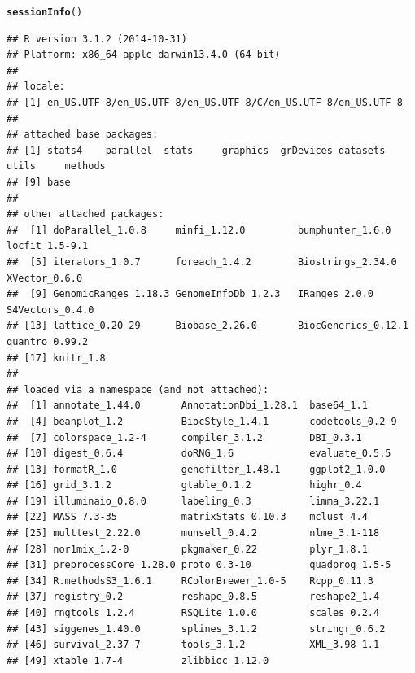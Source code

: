 \documentclass{article}\usepackage[]{graphicx}\usepackage[usenames,dvipsnames]{color}
\makeatletter
\newcommand{\hlstd}[1]{\textcolor[rgb]{0.345,0.345,0.345}{#1}}%
\newcommand{\hlkwd}[1]{\textcolor[rgb]{0.737,0.353,0.396}{\textbf{#1}}}%
\newenvironment{kframe}{%
 \def\at@end@of@kframe{}%
 \ifinner\ifhmode%
  \def\at@end@of@kframe{\end{minipage}}%
  \begin{minipage}{\columnwidth}%
 \fi\fi%
 \def\FrameCommand##1{\hskip\@totalleftmargin \hskip-\fboxsep
 \colorbox{shadecolor}{##1}\hskip-\fboxsep
     \hskip-\linewidth \hskip-\@totalleftmargin \hskip\columnwidth}%
 \MakeFramed {\advance\hsize-\width
   \@totalleftmargin\z@ \linewidth\hsize
   \@setminipage}}%
 {\par\unskip\endMakeFramed%
 \at@end@of@kframe}
\newenvironment{knitrout}{}{} %
\makeatother
\begin{document}
\begin{knitrout}
\color{fgcolor}\begin{kframe}
\begin{alltt}
\hlkwd{sessionInfo}\hlstd{()}
\end{alltt}
\begin{verbatim}
## R version 3.1.2 (2014-10-31)
## Platform: x86_64-apple-darwin13.4.0 (64-bit)
## 
## locale:
## [1] en_US.UTF-8/en_US.UTF-8/en_US.UTF-8/C/en_US.UTF-8/en_US.UTF-8
## 
## attached base packages:
## [1] stats4    parallel  stats     graphics  grDevices datasets  utils     methods  
## [9] base     
## 
## other attached packages:
##  [1] doParallel_1.0.8     minfi_1.12.0         bumphunter_1.6.0     locfit_1.5-9.1      
##  [5] iterators_1.0.7      foreach_1.4.2        Biostrings_2.34.0    XVector_0.6.0       
##  [9] GenomicRanges_1.18.3 GenomeInfoDb_1.2.3   IRanges_2.0.0        S4Vectors_0.4.0     
## [13] lattice_0.20-29      Biobase_2.26.0       BiocGenerics_0.12.1  quantro_0.99.2      
## [17] knitr_1.8           
## 
## loaded via a namespace (and not attached):
##  [1] annotate_1.44.0       AnnotationDbi_1.28.1  base64_1.1           
##  [4] beanplot_1.2          BiocStyle_1.4.1       codetools_0.2-9      
##  [7] colorspace_1.2-4      compiler_3.1.2        DBI_0.3.1            
## [10] digest_0.6.4          doRNG_1.6             evaluate_0.5.5       
## [13] formatR_1.0           genefilter_1.48.1     ggplot2_1.0.0        
## [16] grid_3.1.2            gtable_0.1.2          highr_0.4            
## [19] illuminaio_0.8.0      labeling_0.3          limma_3.22.1         
## [22] MASS_7.3-35           matrixStats_0.10.3    mclust_4.4           
## [25] multtest_2.22.0       munsell_0.4.2         nlme_3.1-118         
## [28] nor1mix_1.2-0         pkgmaker_0.22         plyr_1.8.1           
## [31] preprocessCore_1.28.0 proto_0.3-10          quadprog_1.5-5       
## [34] R.methodsS3_1.6.1     RColorBrewer_1.0-5    Rcpp_0.11.3          
## [37] registry_0.2          reshape_0.8.5         reshape2_1.4         
## [40] rngtools_1.2.4        RSQLite_1.0.0         scales_0.2.4         
## [43] siggenes_1.40.0       splines_3.1.2         stringr_0.6.2        
## [46] survival_2.37-7       tools_3.1.2           XML_3.98-1.1         
## [49] xtable_1.7-4          zlibbioc_1.12.0
\end{verbatim}
\end{kframe}
\end{knitrout}



\end{document}
